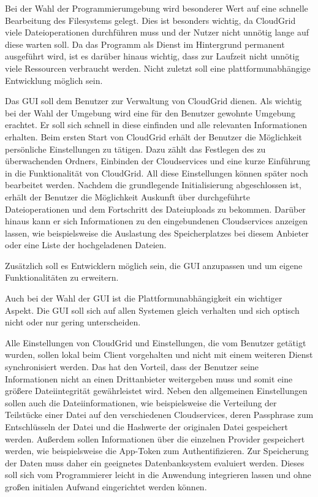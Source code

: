 Bei der Wahl der Programmierumgebung wird besonderer Wert auf eine schnelle Bearbeitung des Filesystems gelegt.
Dies ist besonders wichtig, da CloudGrid viele Dateioperationen durchführen muss und der Nutzer nicht unnötig lange auf diese warten soll.
Da das Programm als Dienst im Hintergrund permanent ausgeführt wird, ist es darüber hinaus wichtig, dass zur Laufzeit nicht unnötig viele Ressourcen verbraucht werden.
Nicht zuletzt soll eine plattformunabhängige Entwicklung möglich sein.

Das \ac{GUI} soll dem Benutzer zur Verwaltung von CloudGrid dienen.
Als wichtig bei der Wahl der Umgebung wird eine für den Benutzer gewohnte Umgebung erachtet.
Er soll sich schnell in diese einfinden und alle relevanten Informationen erhalten.
Beim ersten Start von CloudGrid erhält der Benutzer die Möglichkeit persönliche Einstellungen zu tätigen.
Dazu zählt das Festlegen des zu überwachenden Ordners, Einbinden der Cloudservices und eine kurze Einführung in die Funktionalität von CloudGrid.
All diese Einstellungen können später noch bearbeitet werden.
Nachdem die grundlegende Initialisierung abgeschlossen ist, erhält der Benutzer die Möglichkeit Auskunft über durchgeführte Dateioperationen und dem Fortschritt des Dateiuploads zu bekommen.
Darüber hinaus kann er sich Informationen zu den eingebundenen Cloudservices anzeigen lassen, wie beispielsweise die Auslastung des Speicherplatzes bei diesem Anbieter oder eine Liste der hochgeladenen Dateien.

Zusätzlich soll es Entwicklern möglich sein, die \ac{GUI} anzupassen und um eigene Funktionalitäten zu erweitern.

Auch bei der Wahl der \ac{GUI} ist die Plattformunabhängigkeit ein wichtiger Aspekt.
Die \ac{GUI} soll sich auf allen Systemen gleich verhalten und sich optisch nicht oder nur gering unterscheiden.

Alle Einstellungen von CloudGrid und Einstellungen, die vom Benutzer getätigt wurden, sollen lokal beim Client vorgehalten und nicht mit einem weiteren Dienst synchronisiert werden.
Das hat den Vorteil, dass der Benutzer seine Informationen nicht an einen Drittanbieter weitergeben muss und somit eine größere Dateiintegrität gewährleistet wird.
Neben den allgemeinen Einstellungen sollen auch die Dateiinformationen, wie beispielsweise die Verteilung der Teilstücke einer Datei auf den verschiedenen Cloudservices, deren Passphrase zum Entschlüsseln der Datei und die Hashwerte der originalen Datei gespeichert werden.
Außerdem sollen Informationen über die einzelnen Provider gespeichert werden, wie beispielsweise die App-Token zum Authentifizieren.
Zur Speicherung der Daten muss daher ein geeignetes Datenbanksystem evaluiert werden.
Dieses soll sich vom Programmierer leicht in die Anwendung integrieren lassen und ohne großen initialen Aufwand eingerichtet werden können.
\newpage

